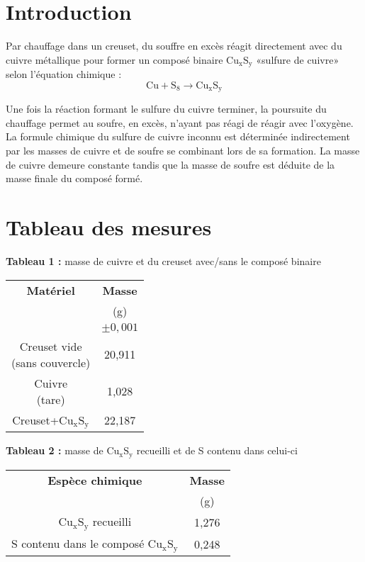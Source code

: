 \documentclass[11pt]{article}
\begin{document}

\section*{Introduction}
Par chauffage dans un creuset, du souffre en excès réagit directement avec du cuivre métallique pour former un composé binaire $\mathrm{Cu_xS_y}$ «sulfure de cuivre» selon l'équation chimique :
\begin{equation}
\mathrm{Cu}+\mathrm{S_8}\rightarrow\mathrm{Cu_{x}S_{y}}
\end{equation}

Une fois la réaction formant le sulfure du cuivre terminer, la poursuite du chauffage permet au soufre, en excès, n'ayant pas réagi de réagir avec l'oxygène. La formule chimique du sulfure de cuivre inconnu est déterminée indirectement par les masses de cuivre et de soufre se combinant lors de sa formation. La masse de cuivre demeure constante tandis que la masse de soufre est déduite de la masse finale du composé formé.

\section*{Tableau des mesures}
\noindent\textbf{Tableau 1 :} masse de cuivre et du creuset avec/sans le composé binaire
\begin{center}
\begin{tabularx}{{\textwidth}}{@{}|c|C|@{}}
\hline
	\bf{Matériel} & \bf{Masse}\\
	              & (g)       \\
	              & $\pm0,001$\\
\hline
	\parbox[c]{3cm}{\centering Creuset vide\\(sans couvercle)} & 20,911\\
\hline
	\parbox[c]{3cm}{\centering Cuivre\\(tare)} & 1,028\\
\hline
	Creuset+$\mathrm{Cu_xS_y}$ & 22,187\\
\hline
\end{tabularx}
\end{center}

\noindent\textbf{Tableau 2 :} masse de $\mathrm{Cu_xS_y}$ recueilli et de S contenu dans celui-ci
\begin{center}
\begin{tabularx}{{\textwidth}}{@{}|c|C|@{}}
\hline
	\bf{Espèce chimique} & \bf{Masse}\\
	                     & (g)       \\
\hline
	$\mathrm{Cu_xS_y}$ recueilli & 1,276\\
\hline
	S contenu dans le composé $\mathrm{Cu_xS_y}$ & 0,248\\
\hline
\end{tabularx}
\end{center}
\end{document}
